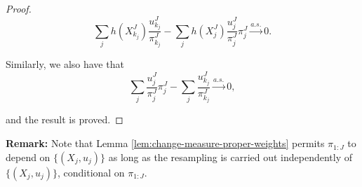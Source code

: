 \documentclass{article}
\begin{document}
\begin{proof}
    $$ \sum_j h(X_{k_j}^J)\frac{u_{k_j}^J}{\pi_{k_j}^J}
    -  \sum_j h(X_j^J)\frac{u_j^J}{\pi_j^J}\pi_j^J \stackrel{a.s.}{\to} 0.$$ 

    Similarly, we also have that
    $$ \sum_j \frac{u_j^J}{\pi_j^J}\pi_j^J
    - \sum_j \frac{u_{k_j}^J}{\pi_{k_j}^J} \stackrel{a.s.}{\to} 0,$$

    and the result is proved. 



    
    
\end{proof}


\textbf{Remark:} Note that Lemma \ref{lem:change-measure-proper-weights} permits $\pi_{1:J}$ to depend on $\{(X_j,u_j)\}$ as long as the resampling is carried out independently of $\{(X_j,u_j)\}$, conditional on $\pi_{1:J}$.
\end{document}
